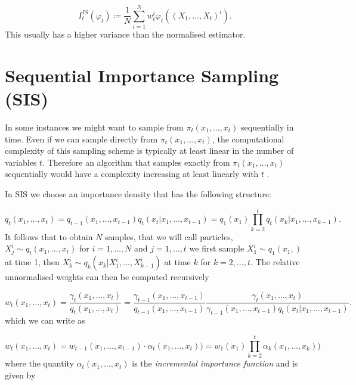 \documentclass[11pt,a4paper]{article}
\begin{document}
\begin{equation*}
    I^{IS}_t(\varphi_t) \coloneqq \frac{1}{N} \sum_{i=1}^N w^i_t\varphi_t((X_1, \dots, X_t)^i).
\end{equation*}
This usually has a higher variance than the normalised estimator.








\section{Sequential Importance Sampling (SIS)} \label{sec:SIS}

In some instances we might want to sample from $\pi_t (x_1, \dots, x_t)$ sequentially in time. Even if we can sample directly from $\pi_t (x_1, \dots, x_t)$, the computational complexity of this sampling scheme is typically at least linear in the number of variables $t$. Therefore an algorithm that samples exactly from $\pi_t (x_1, \dots, x_t)$ sequentially would have a complexity increasing at least linearly with $t$ \cite{DoucetTutorial}.

In SIS we choose an importance density that has the following structure:

\begin{equation*}
    q_t (x_1, \dots, x_t) = q_{t-1} (x_1, \dots, x_{t-1}) q_t(x_t | x_1, \dots, x_{t-1}) = q_1 (x_1) \prod_{k=2}^t q_t(x_k | x_1, \dots, x_{k-1}).
\end{equation*}
It follows that to obtain $N$ samples, that we will call particles, $X^i_j \sim q_t (x_1, \dots, x_t)$ for $i = 1, \dots, N$ and $j = 1, \dots, t$ we first sample $X^i_1 \sim q_1 (x_1,)$ at time 1, then $X^i_k \sim q_k (x_k | X^i_1, \dots, X^i_{k-1})$ at time $k$ for $k = 2, \dots, t$. The relative unnormalised weights can then be computed recursively

\begin{equation*}
    w_t (x_1, \dots, x_t) = \frac{\gamma_t (x_1, \dots, x_t)}{q_t (x_1, \dots, x_t)} = \frac{\gamma_{t-1} (x_1, \dots, x_{t-1})}{q_{t-1} (x_1, \dots, x_{t-1})} \frac{\gamma_t (x_1, \dots, x_t)}{\gamma_{t-1} (x_1, \dots, x_{t-1}) q_t(x_t | x_1, \dots, x_{t-1})}.
\end{equation*}
which we can write as

\begin{equation*}
    w_t (x_1, \dots, x_t) = w_{t-1} (x_1, \dots, x_{t-1}) \cdot \alpha_t (x_1, \dots, x_t)) =  w_1 (x_1)\prod_{k = 2}^t \alpha_k (x_1, \dots, x_k))
\end{equation*}
where the quantity $\alpha_t (x_1, \dots, x_t)$ is the \textit{incremental importance function} and is given by
\end{document}
